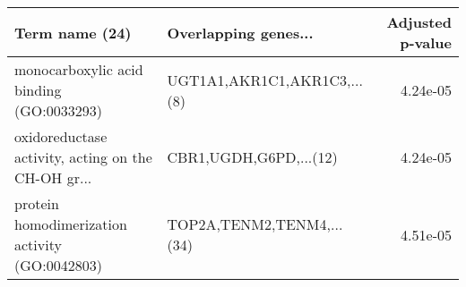 \begin{tabular}{llr}
\toprule
                                    Term name (24) &        Overlapping genes... &  Adjusted p-value \\
\midrule
          monocarboxylic acid binding (GO:0033293) & UGT1A1,AKR1C1,AKR1C3,...(8) &          4.24e-05 \\
oxidoreductase activity, acting on the CH-OH gr... &      CBR1,UGDH,G6PD,...(12) &          4.24e-05 \\
    protein homodimerization activity (GO:0042803) &   TOP2A,TENM2,TENM4,...(34) &          4.51e-05 \\
\bottomrule
\end{tabular}
